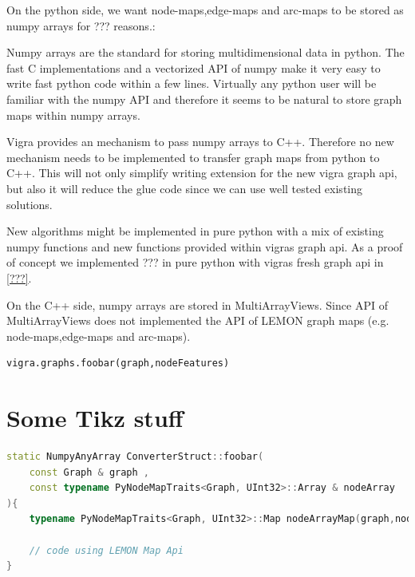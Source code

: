 On the python side, we want node-maps,edge-maps and arc-maps to be stored 
as numpy arrays for ??? reasons.:
\begin{compactitem}
    \item Numpy arrays are the standard for storing multidimensional data in python.
    The fast C implementations and a vectorized API of numpy make it very easy to write 
    fast python code within a few lines.
    Virtually any python user will be familiar with the numpy API and therefore it 
    seems to be natural to store graph maps within numpy arrays.
    \item Vigra provides an mechanism to pass numpy arrays to C++.
    Therefore no new mechanism needs to be implemented to transfer graph
    maps from python to C++.
    This will not only simplify writing extension for the new vigra graph api,
    but also it will reduce the glue code since we can use well tested existing
    solutions.
    \item New algorithms might be implemented in pure python with a mix of
    existing numpy functions and new functions provided within vigras graph api.
    As a proof of concept we implemented ??? in pure python with vigras
    fresh graph api in \cref{???}.
\end{compactitem}

On the C++ side, numpy arrays are stored in MultiArrayViews.
Since API of MultiArrayViews \cite{software_vigra_multiarray_api} does
not implemented the API  of LEMON graph maps (e.g. node-maps,edge-maps and arc-maps).
 

\begin{lstlisting}[language=python]
vigra.graphs.foobar(graph,nodeFeatures)
\end{lstlisting}
\section{Some Tikz stuff}




\begin{lstlisting}[language=c++]
static NumpyAnyArray ConverterStruct::foobar(
    const Graph & graph , 
    const typename PyNodeMapTraits<Graph, UInt32>::Array & nodeArray
){
    typename PyNodeMapTraits<Graph, UInt32>::Map nodeArrayMap(graph,nodeArray)

    // code using LEMON Map Api 
}
\end{lstlisting}
